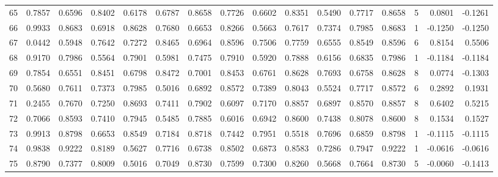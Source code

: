 \begin{tabular}{lrrrrrrrrrrrrrrr}
65  &      0.7857 &  0.6596 &  0.8402 &  0.6178 &  0.6787 &  0.8658 &  0.7726 &  0.6602 &  0.8351 &  0.5490 &   0.7717 &     0.8658 &      5 &                    0.0801 &                    -0.1261 \\
66  &      0.9933 &  0.8683 &  0.6918 &  0.8628 &  0.7680 &  0.6653 &  0.8266 &  0.5663 &  0.7617 &  0.7374 &   0.7985 &     0.8683 &      1 &                   -0.1250 &                    -0.1250 \\
67  &      0.0442 &  0.5948 &  0.7642 &  0.7272 &  0.8465 &  0.6964 &  0.8596 &  0.7506 &  0.7759 &  0.6555 &   0.8549 &     0.8596 &      6 &                    0.8154 &                     0.5506 \\
68  &      0.9170 &  0.7986 &  0.5564 &  0.7901 &  0.5981 &  0.7475 &  0.7910 &  0.5920 &  0.7888 &  0.6156 &   0.6835 &     0.7986 &      1 &                   -0.1184 &                    -0.1184 \\
69  &      0.7854 &  0.6551 &  0.8451 &  0.6798 &  0.8472 &  0.7001 &  0.8453 &  0.6761 &  0.8628 &  0.7693 &   0.6758 &     0.8628 &      8 &                    0.0774 &                    -0.1303 \\
70  &      0.5680 &  0.7611 &  0.7373 &  0.7985 &  0.5016 &  0.6892 &  0.8572 &  0.7389 &  0.8043 &  0.5524 &   0.7717 &     0.8572 &      6 &                    0.2892 &                     0.1931 \\
71  &      0.2455 &  0.7670 &  0.7250 &  0.8693 &  0.7411 &  0.7902 &  0.6097 &  0.7170 &  0.8857 &  0.6897 &   0.8570 &     0.8857 &      8 &                    0.6402 &                     0.5215 \\
72  &      0.7066 &  0.8593 &  0.7410 &  0.7945 &  0.5485 &  0.7885 &  0.6016 &  0.6942 &  0.8600 &  0.7438 &   0.8078 &     0.8600 &      8 &                    0.1534 &                     0.1527 \\
73  &      0.9913 &  0.8798 &  0.6653 &  0.8549 &  0.7184 &  0.8718 &  0.7442 &  0.7951 &  0.5518 &  0.7696 &   0.6859 &     0.8798 &      1 &                   -0.1115 &                    -0.1115 \\
74  &      0.9838 &  0.9222 &  0.8189 &  0.5627 &  0.7716 &  0.6738 &  0.8502 &  0.6873 &  0.8583 &  0.7286 &   0.7947 &     0.9222 &      1 &                   -0.0616 &                    -0.0616 \\
75  &      0.8790 &  0.7377 &  0.8009 &  0.5016 &  0.7049 &  0.8730 &  0.7599 &  0.7300 &  0.8260 &  0.5668 &   0.7664 &     0.8730 &      5 &                   -0.0060 &                    -0.1413 \\

\end{tabular}

